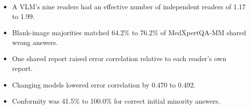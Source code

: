 \begin{itemize}
\item A VLM's nine readers had an effective number of independent readers of 1.17 to 1.99.
\item Blank-image majorities matched 64.2\% to 76.2\% of MedXpertQA-MM shared wrong answers.
\item One shared report raised error correlation relative to each reader's own report.
\item Changing models lowered error correlation by 0.470 to 0.492.
\item Conformity was 41.5\% to 100.0\% for correct initial minority answers.
\end{itemize}
